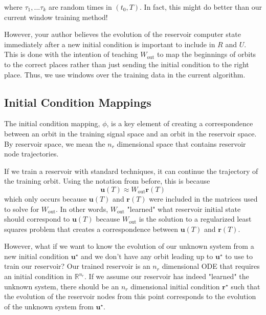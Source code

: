 \documentclass{article}
\begin{document}
where $\tau_1, ... \tau_k$ are random times in $(t_0, T)$. In fact, this might do better than our current window training method!

However, your author believes the evolution of the reservoir computer state immediately after a new initial condition is important to include in $R$ and $U$. This is done with the intention of teaching $W_\text{out}$ to map the beginnings of orbits to the correct places rather than just sending the initial condition to the right place. Thus, we use windows over the training data in the current algorithm.

\subsection*{Initial Condition Mappings}

The initial condition mapping, $\phi$, is a key element of creating a correspondence between an orbit in the training signal space and an orbit in the reservoir space. By reservoir space, we mean the $n_r$ dimensional space that contains reservoir node trajectories.

If we train a reservoir with standard techniques, it can continue the trajectory of the training orbit. Using the notation from before, this is because
\[
\mathbf{u}(T) \approx W_\text{out} \mathbf{r}(T)
\]
 which only occurs because $\mathbf{u}(T)$ and $\mathbf{r}(T)$ were included in the matrices used to solve for $W_\text{out}$. In other words, $W_\text{out}$ "learned" what reservoir initial state should correspond to $\mathbf{u}(T)$ because $W_\text{out}$ is the solution to a regularized least squares problem that creates a correspondence between  $\mathbf{u}(T)$ and $\mathbf{r}(T)$.

However, what if we want to know the evolution of our unknown system from a new initial condition $\mathbf{u}^\star$ and we don't have any orbit leading up to $\mathbf{u}^\star$ to use to train our reservoir? 
Our trained reservoir is an $n_r$ dimensional ODE that requires an initial condition in $\mathbb{R}^{n_r}$. 
If we assume our reservoir has indeed "learned" the unknown system, there should be an $n_r$ dimensional initial condition $\mathbf{r}^\star$ such that the evolution of the reservoir nodes from this point corresponds to the evolution of the unknown system from $\mathbf{u}^\star$. 
\end{document}
